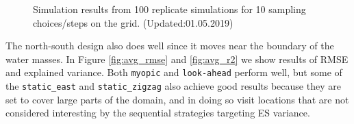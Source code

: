\documentclass[aoas]{imsart}
\begin{document}
\begin{figure}[!th]
\caption{Simulation results from 100 replicate simulations for 10
  sampling choices/steps on the grid. (Updated:01.05.2019)} 
\label{fig:sim_results}
\end{figure}

The north-south design also does well since it moves near the boundary
of the water masses. In Figure \ref{fig:avg_rmse} and \ref{fig:avg_r2}
we show results of RMSE and explained variance. Both \texttt{myopic}
and \texttt{look-ahead} perform well, but some of the
\texttt{static\_east} and \texttt{static\_zigzag} also achieve good
results because they are set to cover large parts of the domain, and
in doing so visit locations that are not considered interesting by the
sequential strategies targeting ES variance.

\begin{figure}[!b]
  \centering
  \hfill
  \hfill

\end{figure}
\end{document}
